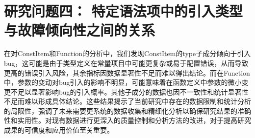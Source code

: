 \section{研究问题四： 特定语法项中的引入类型与故障倾向性之间的关系}
在对ConstItem和Function的分析中，我们发现ConstItem的type子成分倾向于引入bug，这可能是由于类型定义在常量项目中可能更复杂或易于配置错误，从而导致更高的错误引入风险，其余指标因数据显著性不足而难以得出结论。而在Function中，参数的变动对bug引入的影响不明显，可能意味着在函数定义中参数的微小变更不足以显著影响bug的引入概率。其他子成分的数据也因不一致性和统计显著性不足而难以形成具体结论。这些结果揭示了当前研究中存在的数据限制和统计分析的局限性，强调了未来需要更系统的数据收集和精细化分析以确保研究结果的准确性和实用性。对现有数据进行更深入的质量控制和分析方法的改进，对于提高研究成果的可信度和应用价值至关重要。

